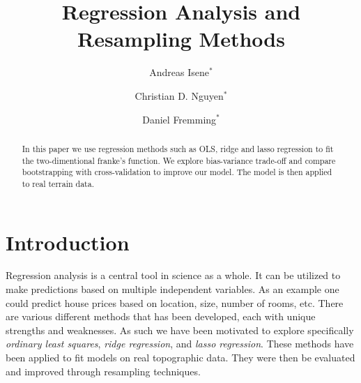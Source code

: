 \documentclass[aps,rmp,reprint,amsmath,amssymb,graphicx,longbibliography]{revtex4-1}
\begin{document}

\title{Regression Analysis and Resampling Methods}

\author{Andreas Isene$^*$}
\author{Christian D. Nguyen$^*$}
\author{Daniel Fremming$^*$}



\begin{abstract}
     In this paper we use regression methods such as OLS, ridge and lasso regression to fit the two-dimentional franke's function. We explore bias-variance trade-off and compare bootstrapping with cross-validation to improve our model. The model is then applied to real terrain data.
\end{abstract}

\maketitle
\def\thefootnote{*}\def\thefootnote{\arabic{footnote}}
\def\thefootnote{$^1$}

\tableofcontents






\section{Introduction}
Regression analysis is a central tool in science as a whole. It can be utilized to make predictions based on multiple independent variables. As an example one could predict house prices based on location, size, number of rooms, etc. There are various different methods that has been developed, each with unique strengths and weaknesses. As such we have been motivated to explore specifically \textit{ordinary least squares}, \textit{ridge regression}, and \textit{lasso regression}. These methods have been applied to fit models on real topographic data. They were then be evaluated and improved through resampling techniques.
\end{document}
